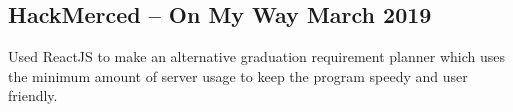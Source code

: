 \documentclass[../Resume.tex]{subfiles}
\begin{document}
    \subsection{HackMerced -- On My Way \null\hfill March 2019}
    \par Used ReactJS to make an alternative graduation requirement planner which uses the minimum amount of server usage to keep the program speedy and user friendly.
    \vspace*{-2mm}
\end{document}
